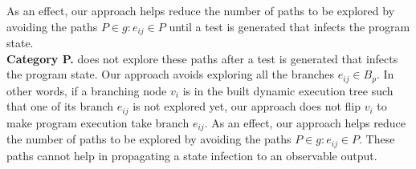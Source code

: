 As an effect, our approach helps reduce the number of paths to be explored by avoiding the paths $P \in g : e_{ij} \in P$ until a test is generated that infects the program state.
\\ \textbf{Category P. }
 does not explore these paths after a test is generated that infects the program state.
Our approach avoids exploring all the branches 
$e_{ij}\in B_p$. In other words, if a branching node $v_i$ is in the built dynamic execution tree such that one of its branch $e_{ij}$ is not explored yet, our approach does not flip $v_i$ to make program execution take branch $e_{ij}$.
As an effect, our approach helps reduce the number of paths to be explored by avoiding the paths $P \in g : e_{ij} \in P$.
These paths cannot help in propagating a state infection to an observable output.

\vspace{-2ex}
